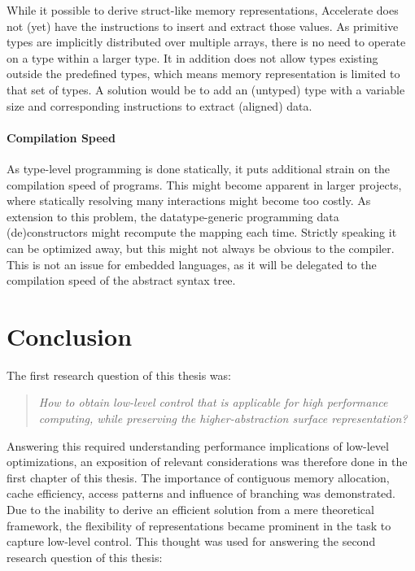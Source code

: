 \documentclass{article}
\begin{document}
While it possible to derive struct-like memory representations, Accelerate does not (yet) have the instructions to insert and extract those values.
As primitive types are implicitly distributed over multiple arrays, there is no need to operate on a type within a larger type. 
It in addition does not allow types existing outside the predefined types, which means memory representation is limited to that set of types.
A solution would be to add an (untyped) type with a variable size and corresponding instructions to extract (aligned) data.

\paragraph{Compilation Speed}

As type-level programming is done statically, it puts additional strain on the compilation speed of programs.
This might become apparent in larger projects, where statically resolving many interactions might become too costly.
As extension to this problem, the datatype-generic programming data (de)constructors might recompute the mapping each time.
Strictly speaking it can be optimized away, but this might not always be obvious to the compiler. 
This is not an issue for embedded languages, as it will be delegated to the compilation speed of the abstract syntax tree. 

\newpage

\section{Conclusion}

The first research question of this thesis was:

\begin{quote}
{\it How to obtain low-level control that is applicable for high performance computing, while preserving the higher-abstraction surface representation?}
\end{quote}

Answering this required understanding performance implications of low-level optimizations, an exposition of relevant considerations was therefore done in the first chapter of this thesis.
The importance of contiguous memory allocation, cache efficiency, access patterns and influence of branching was demonstrated.
Due to the inability to derive an efficient solution from a mere theoretical framework, the flexibility of representations became prominent in the task to capture low-level control.  
This thought was used for answering the second research question of this thesis:
\end{document}
